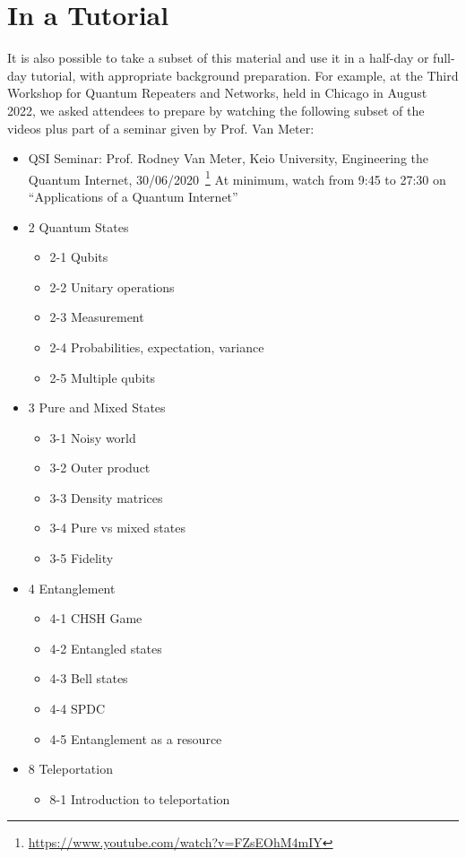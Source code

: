 \section*{In a Tutorial}

It is also possible to take a subset of this material and use it in a half-day or full-day tutorial, with appropriate background preparation.  For example, at the Third Workshop for Quantum Repeaters and Networks, held in Chicago in August 2022, we asked attendees to prepare by watching the following subset of the videos plus part of a seminar given by Prof. Van Meter:
\begin{itemize}
\item QSI Seminar: Prof. Rodney Van Meter, Keio University, Engineering the Quantum Internet, 30/06/2020~\footnote{\url{https://www.youtube.com/watch?v=FZsEOhM4mIY}}
At minimum, watch from 9:45 to 27:30 on 
“Applications of a Quantum Internet”
\item 2 Quantum States
\begin{itemize}
\item 2-1 Qubits
\item 2-2 Unitary operations				
\item 2-3 Measurement
\item 2-4 Probabilities, expectation, variance
\item 2-5 Multiple qubits
\end{itemize}
\item 3 Pure and Mixed States
\begin{itemize}
\item 3-1 Noisy world
\item 3-2 Outer product
\item 3-3 Density matrices
\item 3-4 Pure vs mixed states
\item 3-5 Fidelity
\end{itemize}
\item 4 Entanglement
\begin{itemize}
\item 4-1 CHSH Game
\item 4-2 Entangled states
\item 4-3 Bell states
\item 4-4 SPDC
\item 4-5 Entanglement as a resource
\end{itemize}
\item 8 Teleportation
\begin{itemize}
\item 8-1 Introduction to teleportation

\end{itemize}
\end{itemize}
